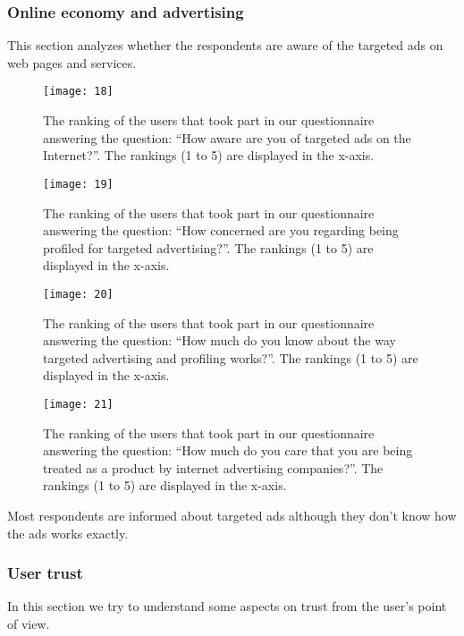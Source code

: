 \subsubsection{Online economy and advertising}

This section analyzes whether the respondents are aware of the targeted ads on 
web pages and services.

\begin{figure}[hp]
\centering
\texttt{[image: 18]}
\caption{The ranking of the users that took part in our questionnaire answering
the question: ``How aware are you of targeted ads on the Internet?''. The
rankings (1 to 5) are displayed in the x-axis.}
\end{figure}

\begin{figure}[hp]
\centering
\texttt{[image: 19]}
\caption{The ranking of the users that took part in our questionnaire answering
the question: ``How concerned are you regarding being profiled for targeted 
advertising?''. The rankings (1 to 5) are displayed in the x-axis.}
\end{figure}

\begin{figure}[hp]
\centering
\texttt{[image: 20]}
\caption{The ranking of the users that took part in our questionnaire answering
the question: ``How much do you know about the way targeted advertising and 
profiling works?''. The rankings (1 to 5) are displayed in the x-axis.}
\end{figure}

\begin{figure}[hp]
\centering
\texttt{[image: 21]}
\caption{The ranking of the users that took part in our questionnaire answering
the question: ``How much do you care that you are being treated as a product by 
internet advertising companies?''. The rankings (1 to 5) are displayed in the 
x-axis.}
\end{figure}

Most respondents are informed about targeted ads although they don't know how 
the ads works exactly.

\subsubsection{User trust}

In this section we try to understand some aspects on trust from the user's point 
of view.


